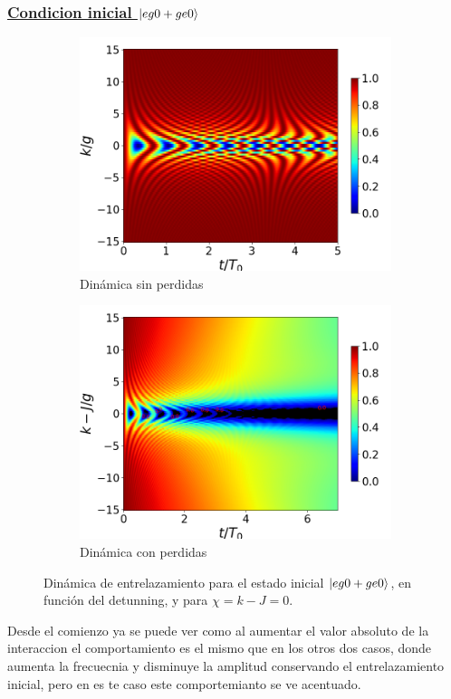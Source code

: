 \subsubsection{\underline{Condicion inicial $\ket{eg0+ge0}$}}
\begin{figure}[h!]
    \centering
    \begin{subfigure}{0.49\textwidth}
        \includegraphics[width=\textwidth]{figuras/ch4/concu/k/eg0+ge0 d=0.0g x=0.0g J=15.0g gamma=0.25g concu k uni.png}
        \caption{Dinámica sin perdidas}
        \label{fig4:concu k 0 uni}
    \end{subfigure}
    \hfill
    \begin{subfigure}{0.49\textwidth}
        \includegraphics[width=\textwidth]{figuras/ch4/concu/k/eg0+ge0 d=0.0g x=0.0g J=15.0g gamma=0.25g concu k dis.png}
        \caption{Dinámica con perdidas}
        \label{fig4:concu k 0 dis}
    \end{subfigure}
    \caption{Dinámica de entrelazamiento para el estado inicial $\ket{eg0+ge0}$, en función del detunning, y para $\chi=k-J=0$.}
    \label{fig4:concu k 0}
\end{figure}
Desde el comienzo ya se puede ver como al aumentar el valor absoluto de la interaccion el comportamiento es el mismo que en los otros dos casos, donde aumenta la frecuecnia y disminuye la amplitud conservando el entrelazamiento inicial, pero en es te caso este comportemianto se ve acentuado. 


